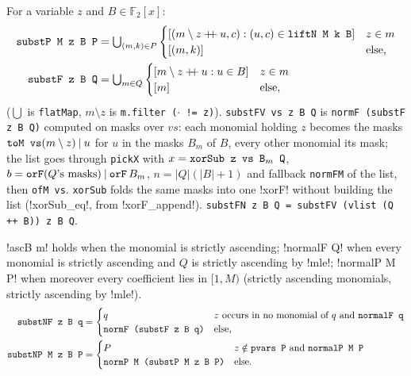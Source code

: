 \begin{definition}[Substitution]\label{def:lean-pathsum-subst}
For a variable $z$ and $B\in\mathbb F_2[x]$:
\begin{align*}
\textnormal{\texttt{substP M z B P}} &= \textstyle\bigcup_{(m,k)\in P}
  \begin{cases}[(m\setminus z \mathbin{+\!\!+} u, c) : (u,c)\in \textnormal{\texttt{liftN M k B}}] & z\in m\\ [(m,k)] & \text{else,}\end{cases}\\
\textnormal{\texttt{substF z B Q}} &= \textstyle\bigcup_{m\in Q}
  \begin{cases}[m\setminus z\mathbin{+\!\!+}u : u\in B] & z\in m\\ [m] & \text{else,}\end{cases}
\end{align*}
($\bigcup$ is \textnormal{\texttt{flatMap}}, $m\setminus z$ is \textnormal{\texttt{m.\allowbreak{}filter (\allowbreak{}\ensuremath{\cdot} != z)}}).
\textnormal{\texttt{substFV vs z B Q}} is \textnormal{\texttt{normF (\allowbreak{}substF z B Q)}} computed on masks over
$vs$: each monomial holding $z$ becomes the masks $\textnormal{\texttt{toM vs}}(m\setminus z)\mathbin{|}u$ for
$u$ in the masks $B_m$ of $B$, every other monomial its mask; the list goes through
\textnormal{\texttt{pickX}} with $x=\textnormal{\texttt{xorSub z vs B}}_m\textnormal{\texttt{ Q}}$,
$b=\textnormal{\texttt{orF}}(Q\text{'s masks})\mathbin{|}\textnormal{\texttt{orF}}\,B_m$, $n=|Q|(|B|+1)$ and fallback
\textnormal{\texttt{normFM}} of the list, then \textnormal{\texttt{ofM vs}}. \textnormal{\texttt{xorSub}} folds the same masks
into one \lean!xorF! without building the list (\lean!xorSub_eq!, from \lean!xorF_append!).
\textnormal{\texttt{substFN z B Q = substFV (vlist (Q ++ B)) z B Q}}.
\end{definition}

\begin{definition}\label{def:lean-pathsum-substn}
\lean!ascB m! holds when the monomial is strictly ascending; \lean!normalF Q! when every monomial
is strictly ascending and $Q$ is strictly ascending by \lean!mle!; \lean!normalP M P! when moreover
every coefficient lies in $[1,M)$ (strictly ascending monomials, strictly ascending by \lean!mle!).
\begin{align*}
\textnormal{\texttt{substNF z B q}} &= \begin{cases} q & z\text{ occurs in no monomial of }q\text{ and }\textnormal{\texttt{normalF q}}\\ \textnormal{\texttt{normF (substF z B q)}} & \text{else,}\end{cases}\\
\textnormal{\texttt{substNP M z B P}} &= \begin{cases} P & z\notin\textnormal{\texttt{pvars P}}\text{ and }\textnormal{\texttt{normalP M P}}\\ \textnormal{\texttt{normP M (substP M z B P)}} & \text{else.}\end{cases}
\end{align*}
\end{definition}

